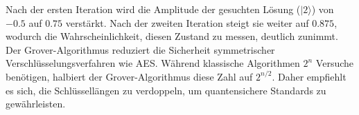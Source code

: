 Nach der ersten Iteration wird die Amplitude der gesuchten Lösung ($|2\rangle$) von $-0.5$ auf $0.75$ verstärkt. 
Nach der zweiten Iteration steigt sie weiter auf $0.875$, wodurch die Wahrscheinlichkeit, diesen Zustand zu messen, deutlich zunimmt.
\\
Der Grover-Algorithmus reduziert die Sicherheit symmetrischer Verschlüsselungsverfahren wie AES. Während klassische 
Algorithmen $2^n$ Versuche benötigen, halbiert der Grover-Algorithmus diese Zahl auf $2^{n/2}$. Daher empfiehlt es sich, die 
Schlüssellängen zu verdoppeln, um quantensichere Standards zu gewährleisten. \cite{grover}


